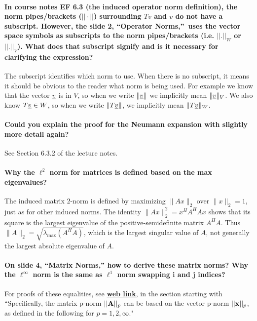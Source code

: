 \documentclass[10pt,english]{article}
\begin{document}
\paragraph{In course notes EF 6.3 (the induced operator norm definition), the norm pipes/brackets ($||\cdot||$) surrounding $Tv$ and $v$ do not have a subscript. However, the slide 2, ``Operator Norms,'' uses the vector space symbols as subscripts to the norm pipes/brackets (i.e. $|| . ||_{W}$ or $|| . ||_{V}$). What does that subscript signify and is it necessary for clarifying the expression?}
The subscript identifies which norm to use.
When there is no subscript, it means it should be obvious to the reader what norm is being used. For example we know that the vector $\underline{v}$ is in $V$, so when we write $\| \underline{v} \|$ we implicitly mean $\|\underline{v}\|_V$.
We also know $T \underline{v} \in W$, so when we write $\|T\underline{v}\|$, we implicitly mean $\|T\underline{v}\|_W$.

\paragraph{Could you explain the proof for the Neumann expansion with slightly more detail again?}
See Section 6.3.2 of the lecture notes.

\paragraph{Why the $\ell^2$ norm for matrices is defined based on the max eigenvalues?}

The induced matrix $2$-norm is defined by maximizing $\|Ax\|_2$ over $\|x\|_2=1$, just as for other induced norms.
The identity $\|Ax\|_2^2=x^H A^H A x$ shows that its square is the largest eigenvalue of the positive-semidefinite matrix $A^H A$.
Thus $\|A\|_2=\sqrt{\lambda_{\max}(A^H A)}$, which is the largest singular value of $A$, not generally the largest absolute eigenvalue of $A$.


\paragraph{On slide 4, ``Matrix Norms,'' how to derive these matrix norms? Why the $\ell^{\infty}$ norm is the same as $\ell^1$ norm swapping i and j indices?}

For proofs of these equalities, see \href{https://www.cs.utexas.edu/users/flame/Notes/NotesOnNorms.pdf}{\textbf{web link}}, in the section starting with ``Specifically, the matrix p-norm $\vert\vert{\bf A}\vert\vert _p$ can be based on the vector p-norm $\vert\vert{\bf x}\vert\vert _p$, as defined in the following for  $p=1, 2, \infty$."
\end{document}
